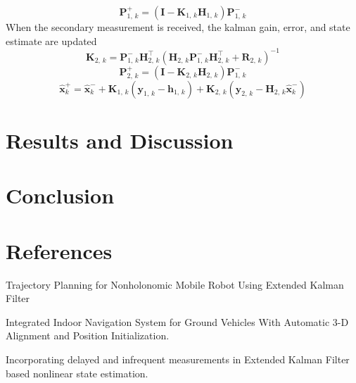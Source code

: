 \documentclass{ieeeaccess}
\begin{document}
	\begin{equation}
	\label{eq:p+}
		\boldsymbol{P}_{1,\,k}^{+} = \left(\boldsymbol{I} - \boldsymbol{K}_{1,\,k}\boldsymbol{H}_{1,\,k}\right)\boldsymbol{P}_{1,\,k}^{-}
	\end{equation}
	When the secondary measurement is received, the kalman gain, error, and state estimate are updated
	\begin{equation}
	\label{eq:K2}
		\boldsymbol{K}_{2,\,k} = \boldsymbol{P}_{1,\,k}^{-}\boldsymbol{H}_{2,\,k}^{\top}\left(\boldsymbol{H}_{2,\,k}\boldsymbol{P}_{1,\,k}^{-}\boldsymbol{H}_{2,\,k}^{\top} + \boldsymbol{R}_{2,\,k} \right)^{-1}
	\end{equation}
	\begin{equation}
	\label{eq:p2+}
		\boldsymbol{P}_{2,\,k}^{+} = \left(\boldsymbol{I} - \boldsymbol{K}_{2,\,k}\boldsymbol{H}_{2,\,k}\right)\boldsymbol{P}_{1,\,k}^{-}
	\end{equation}
	\begin{equation}
	\label{eq:x+}
		\hat{\boldsymbol{x}}_{k}^{+}=\hat{\boldsymbol{x}}_{k}^{-} + \boldsymbol{K}_{1,\,k}\left(\boldsymbol{y}_{1,\,k}- \boldsymbol{h}_{1,\,k}\right) + \boldsymbol{K}_{2,\,k}\left(\boldsymbol{y}_{2,\,k}-\boldsymbol{H}_{2,\,k}\hat{\boldsymbol{x}}_{k}^{-}\right)
	\end{equation}
\section{Results and Discussion}
\label{sec:res}


\section{Conclusion}
\label{sec:con}


\section{References}
Trajectory Planning for Nonholonomic Mobile Robot Using Extended Kalman Filter\par
Integrated Indoor Navigation System for Ground Vehicles With Automatic 3-D Alignment and Position Initialization.\par
Incorporating delayed and infrequent measurements in Extended Kalman Filter based nonlinear state estimation.\par

\EOD
\end{document}
